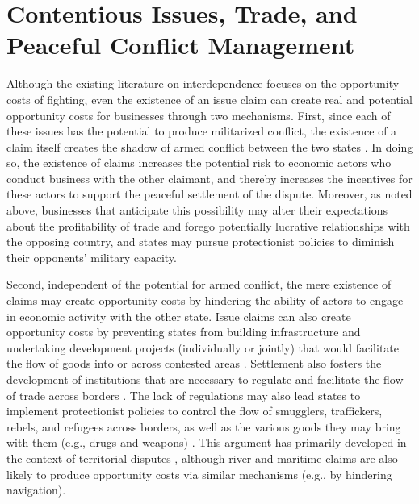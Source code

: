 \documentclass[../../dissertation.tex]{subfiles}
\begin{document}
\section{Contentious Issues, Trade, and Peaceful Conflict Management}


Although the existing literature on interdependence focuses on the opportunity costs of fighting, even the existence of an issue claim can create real and potential opportunity costs for businesses through two mechanisms. First, since each of these issues has the potential to produce militarized conflict, the existence of a claim itself creates the shadow of armed conflict between the two states \citep{lee2012, schultz2015, simmons2005}. In doing so, the existence of claims increases the potential risk to economic actors who conduct business with the other claimant, and thereby increases the incentives for these actors to support the peaceful settlement of the dispute. Moreover, as noted above, businesses that anticipate this possibility may alter their expectations about the profitability of trade and forego potentially lucrative relationships with the opposing country, and states may pursue protectionist policies to diminish their opponents’ military capacity. 

Second, independent of the potential for armed conflict, the mere existence of claims may create opportunity costs by hindering the ability of actors to engage in economic activity with the other state. 
Issue claims can also create opportunity costs by preventing states from building infrastructure and undertaking development projects (individually or jointly) that would facilitate the flow of goods into or across contested areas \citep{carter2018, gavrilis2008, simmons2005, toset2000}. Settlement also fosters the development of institutions that are necessary to regulate and facilitate the flow of trade across borders \citep{carter2010, carter2014, simmons2005}. The lack of regulations may also lead states to implement protectionist policies to control the flow of smugglers, traffickers, rebels, and refugees across borders, as well as the various goods they may bring with them (e.g., drugs and weapons) \citep[e.g.,][]{carter2017, gavrilis2008, simmons2005}. This argument has primarily developed in the context of territorial disputes \citep[e.g., ][]{carter2018, schultz2015, simmons1999, simmons2002, simmons2005, simmons2006a}, although river and maritime claims are also likely to produce opportunity costs via similar mechanisms (e.g., by hindering navigation). 
\end{document}
